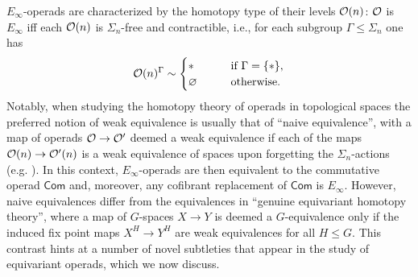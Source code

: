 \documentclass[a4paper,10pt]{article}%
\begin{document}
$E_\infty$-operads are characterized by the homotopy type of their levels $\mathcal{O}(n)$: $\mathcal{O}$ is $E_\infty$ iff each $\mathcal{O}(n)$ is $\Sigma_n$-free and contractible, i.e., for each subgroup $\Gamma \leq \Sigma_n$ one has
\[
\mathcal{O}(n)^\Gamma \sim
\begin{cases}
        * & \text{if } \Gamma = \{*\} , \\
        \varnothing \qquad & \text{otherwise.}
\end{cases}
\]
Notably, when studying the homotopy theory of operads in topological spaces
the preferred notion of weak equivalence is 
usually that of ``naive equivalence'',
with a map of operads 
$\mathcal{O} \to \mathcal{O}'$
deemed a weak equivalence if each of the maps
$\mathcal{O}(n) \to \mathcal{O}'(n)$
is a weak equivalence of spaces
upon forgetting the $\Sigma_n$-actions (e.g. \cite[3.2]{BM03}).
In this context, $E_\infty$-operads are then equivalent to the commutative operad $\mathsf{Com}$ and, moreover, 
any cofibrant replacement of $\mathsf{Com}$
is $E_{\infty}$.
However, naive equivalences differ from the equivalences in ``genuine equivariant homotopy theory'', where a map of $G$-spaces $X \to Y$ is deemed a $G$-equivalence only if the induced fix point maps $X^H \to Y^H$ are weak equivalences for all $H \leq G$.
This contrast hints at a number of novel subtleties that appear in the study of equivariant operads, which we now discuss.
\end{document}
